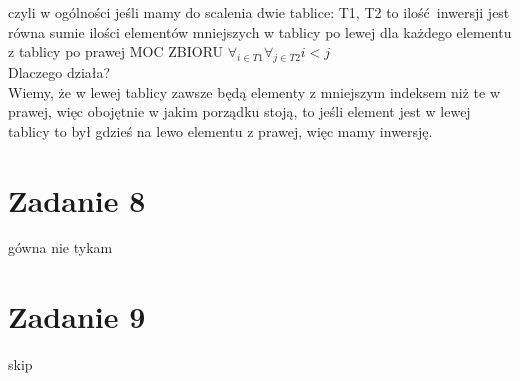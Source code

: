 \documentclass[12pt]{article}
\begin{document}
czyli w ogólności jeśli mamy do scalenia dwie tablice:
T1, T2
to ilość inwersji jest równa sumie ilości elementów mniejszych w tablicy po lewej dla każdego elementu z tablicy po prawej
MOC ZBIORU $\forall_{i \in T1} \forall_{j \in T2} i<j$\\

Dlaczego działa?\\
Wiemy, że w lewej tablicy zawsze będą elementy z mniejszym indeksem niż te w prawej, więc obojętnie w jakim porządku stoją, to jeśli element jest w lewej tablicy to był gdzieś na lewo elementu z prawej, więc mamy inwersję.\\

\section{Zadanie 8}
gówna nie tykam

\section{Zadanie 9}
skip



\egroup
\end{document}
